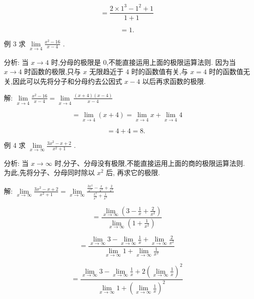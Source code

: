 \documentclass[10pt]{article}
\begin{document}
\[
= \frac{2 \times {1}^{3} - {1}^{2} + 1}{1 + 1}
\]

\[
= 1\text{.}
\]

例 3 求 \(\mathop{\lim }\limits_{{x \rightarrow 4}}\frac{{x}^{2} - {16}}{x - 4}\) .

分析: 当 \(x \rightarrow 4\) 时,分母的极限是 0,不能直接运用上面的极限运算法则. 因为当 \(x \rightarrow 4\) 时函数的极限,只与 \(x\) 无限趋近于 4 时的函数值有关,与 \(x = 4\) 时的函数值无关,因此可以先将分子和分母约去公因式 \(x - 4\) 以后再求函数的极限.

解: \(\mathop{\lim }\limits_{{x \rightarrow 4}}\frac{{x}^{2} - {16}}{x - 4} = \mathop{\lim }\limits_{{x \rightarrow 4}}\frac{\left( {x + 4}\right) \left( {x - 4}\right) }{x - 4}\)

\[
= \mathop{\lim }\limits_{{x \rightarrow 4}}\left( {x + 4}\right) = \mathop{\lim }\limits_{{x \rightarrow 4}}x + \mathop{\lim }\limits_{{x \rightarrow 4}}4
\]

\[
= 4 + 4 = 8\text{. }
\]

例 4 求 \(\mathop{\lim }\limits_{{x \rightarrow \infty }}\frac{3{x}^{2} - x + 2}{{x}^{2} + 1}\) .

分析: 当 \(x \rightarrow \infty\) 时,分子、分母没有极限,不能直接运用上面的商的极限运算法则. 为此,先将分子、分母同时除以 \({x}^{2}\) 后, 再求它的极限.

解: \(\mathop{\lim }\limits_{{x \rightarrow \infty }}\frac{3{x}^{2} - x + 2}{{x}^{2} + 1} = \mathop{\lim }\limits_{{x \rightarrow \infty }}\frac{\frac{3{x}^{2}}{{x}^{2}} - \frac{x}{{x}^{2}} + \frac{2}{{x}^{2}}}{\frac{{x}^{2}}{{x}^{2}} + \frac{1}{{x}^{2}}}\)

\[
= \frac{\mathop{\lim }\limits_{{x \rightarrow \infty }}\left( {3 - \frac{1}{x} + \frac{2}{{x}^{2}}}\right) }{\mathop{\lim }\limits_{{x \rightarrow \infty }}\left( {1 + \frac{1}{{x}^{2}}}\right) }
\]

\[
= \frac{\mathop{\lim }\limits_{{x \rightarrow \infty }}3 - \mathop{\lim }\limits_{{x \rightarrow \infty }}\frac{1}{x} + \mathop{\lim }\limits_{{x \rightarrow \infty }}\frac{2}{{x}^{2}}}{\mathop{\lim }\limits_{{x \rightarrow \infty }}1 + \mathop{\lim }\limits_{{x \rightarrow \infty }}\frac{1}{{x}^{2}}}
\]

\[
= \frac{\mathop{\lim }\limits_{{x \rightarrow \infty }}3 - \mathop{\lim }\limits_{{x \rightarrow \infty }}\frac{1}{x} + 2{\left( \mathop{\lim }\limits_{{x \rightarrow \infty }}\frac{1}{x}\right) }^{2}}{\mathop{\lim }\limits_{{x \rightarrow \infty }}1 + {\left( \mathop{\lim }\limits_{{x \rightarrow \infty }}\frac{1}{x}\right) }^{2}}
\]
\end{document}
